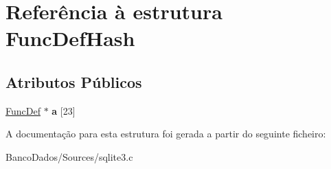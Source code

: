 \hypertarget{struct_func_def_hash}{\section{Referência à estrutura Func\-Def\-Hash}
\label{struct_func_def_hash}
}
\subsection*{Atributos Públicos}
\begin{DoxyCompactItemize}
\item 
\hypertarget{struct_func_def_hash_a3e044ccfe432770ef7297e86e405cc96}{\hyperlink{struct_func_def}{Func\-Def} $\ast$ {\bfseries a} \mbox{[}23\mbox{]}}\label{struct_func_def_hash_a3e044ccfe432770ef7297e86e405cc96}

\end{DoxyCompactItemize}


A documentação para esta estrutura foi gerada a partir do seguinte ficheiro\-:\begin{DoxyCompactItemize}
\item 
Banco\-Dados/\-Sources/sqlite3.\-c\end{DoxyCompactItemize}
